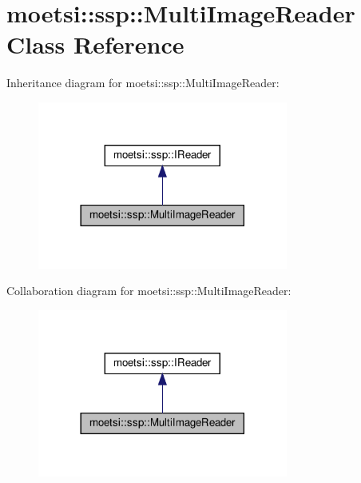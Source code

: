 \hypertarget{classmoetsi_1_1ssp_1_1MultiImageReader}{}\section{moetsi\+:\+:ssp\+:\+:Multi\+Image\+Reader Class Reference}
\label{classmoetsi_1_1ssp_1_1MultiImageReader}


Inheritance diagram for moetsi\+:\+:ssp\+:\+:Multi\+Image\+Reader\+:
\nopagebreak
\begin{figure}[H]
\begin{center}
\leavevmode
\includegraphics[width=233pt]{classmoetsi_1_1ssp_1_1MultiImageReader__inherit__graph}
\end{center}
\end{figure}


Collaboration diagram for moetsi\+:\+:ssp\+:\+:Multi\+Image\+Reader\+:
\nopagebreak
\begin{figure}[H]
\begin{center}
\leavevmode
\includegraphics[width=233pt]{classmoetsi_1_1ssp_1_1MultiImageReader__coll__graph}
\end{center}
\end{figure}
